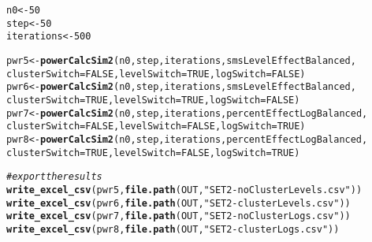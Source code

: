 \documentclass[10pt]{article}\usepackage[]{graphicx}\usepackage[]{color}
\makeatletter
\newcommand{\hlnum}[1]{\textcolor[rgb]{0.686,0.059,0.569}{#1}}%
\newcommand{\hlstr}[1]{\textcolor[rgb]{0.192,0.494,0.8}{#1}}%
\newcommand{\hlcom}[1]{\textcolor[rgb]{0.678,0.584,0.686}{\textit{#1}}}%
\newcommand{\hlstd}[1]{\textcolor[rgb]{0.345,0.345,0.345}{#1}}%
\newcommand{\hlkwb}[1]{\textcolor[rgb]{0.69,0.353,0.396}{#1}}%
\newcommand{\hlkwc}[1]{\textcolor[rgb]{0.333,0.667,0.333}{#1}}%
\newcommand{\hlkwd}[1]{\textcolor[rgb]{0.737,0.353,0.396}{\textbf{#1}}}%
\newenvironment{kframe}{%
 \def\at@end@of@kframe{}%
 \ifinner\ifhmode%
  \def\at@end@of@kframe{\end{minipage}}%
  \begin{minipage}{\columnwidth}%
 \fi\fi%
 \def\FrameCommand##1{\hskip\@totalleftmargin \hskip-\fboxsep
 \colorbox{shadecolor}{##1}\hskip-\fboxsep
     \hskip-\linewidth \hskip-\@totalleftmargin \hskip\columnwidth}%
 \MakeFramed {\advance\hsize-\width
   \@totalleftmargin\z@ \linewidth\hsize
   \@setminipage}}%
 {\par\unskip\endMakeFramed%
 \at@end@of@kframe}
\newenvironment{knitrout}{}{} %
\makeatother
\begin{document}
\begin{knitrout}
\color{fgcolor}\begin{kframe}
\begin{alltt}
\hlstd{n0} \hlkwb{<-} \hlnum{50}
\hlstd{step} \hlkwb{<-} \hlnum{50}
\hlstd{iterations} \hlkwb{<-} \hlnum{500}

\hlstd{pwr5} \hlkwb{<-} \hlkwd{powerCalcSim2}\hlstd{(n0,step,iterations, smsLevelEffectBalanced,}
                       \hlkwc{clusterSwitch} \hlstd{=} \hlnum{FALSE}\hlstd{,} \hlkwc{levelSwitch} \hlstd{=} \hlnum{TRUE}\hlstd{,}  \hlkwc{logSwitch} \hlstd{=} \hlnum{FALSE}\hlstd{)}
\hlstd{pwr6} \hlkwb{<-} \hlkwd{powerCalcSim2}\hlstd{(n0,step,iterations, smsLevelEffectBalanced,}
                       \hlkwc{clusterSwitch} \hlstd{=} \hlnum{TRUE}\hlstd{,}  \hlkwc{levelSwitch} \hlstd{=} \hlnum{TRUE}\hlstd{,}  \hlkwc{logSwitch} \hlstd{=} \hlnum{FALSE}\hlstd{)}
\hlstd{pwr7} \hlkwb{<-} \hlkwd{powerCalcSim2}\hlstd{(n0,step,iterations, percentEffectLogBalanced,}
                       \hlkwc{clusterSwitch} \hlstd{=} \hlnum{FALSE}\hlstd{,} \hlkwc{levelSwitch} \hlstd{=} \hlnum{FALSE}\hlstd{,} \hlkwc{logSwitch} \hlstd{=} \hlnum{TRUE}\hlstd{)}
\hlstd{pwr8} \hlkwb{<-} \hlkwd{powerCalcSim2}\hlstd{(n0,step,iterations,percentEffectLogBalanced,}
                       \hlkwc{clusterSwitch} \hlstd{=} \hlnum{TRUE}\hlstd{,}  \hlkwc{levelSwitch} \hlstd{=} \hlnum{FALSE}\hlstd{,} \hlkwc{logSwitch} \hlstd{=} \hlnum{TRUE}\hlstd{)}
\end{alltt}
\end{kframe}
\end{knitrout}

\begin{knitrout}
\color{fgcolor}\begin{kframe}
\begin{alltt}
\hlcom{# export the results}
\hlkwd{write_excel_csv}\hlstd{(pwr5,} \hlkwd{file.path}\hlstd{(OUT,}\hlstr{"SET2-noClusterLevels.csv"}\hlstd{))}
\hlkwd{write_excel_csv}\hlstd{(pwr6,} \hlkwd{file.path}\hlstd{(OUT,}\hlstr{"SET2-clusterLevels.csv"}\hlstd{))}
\hlkwd{write_excel_csv}\hlstd{(pwr7,} \hlkwd{file.path}\hlstd{(OUT,}\hlstr{"SET2-noClusterLogs.csv"}\hlstd{))}
\hlkwd{write_excel_csv}\hlstd{(pwr8,} \hlkwd{file.path}\hlstd{(OUT,}\hlstr{"SET2-clusterLogs.csv"}\hlstd{))}
\end{alltt}
\end{kframe}
\end{knitrout}
\end{document}
